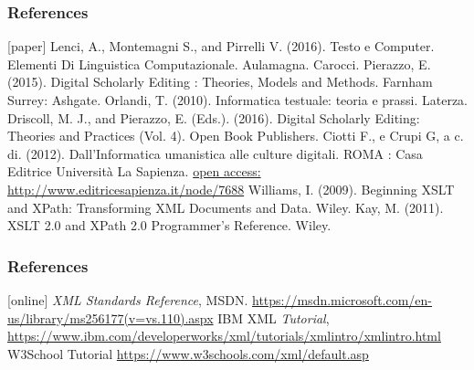 




\begin{frame}
    \frametitle{References}
    \addtocounter{nframe}{1}
    \begin{thebibliography}{10}
        [paper]
        \tiny{} Lenci, A., Montemagni S., and Pirrelli V. (2016). Testo e Computer. Elementi Di Linguistica Computazionale. Aulamagna. Carocci.
        \tiny{} Pierazzo, E. (2015). Digital Scholarly Editing : Theories, Models and Methods. Farnham Surrey: Ashgate.
        \tiny{} Orlandi, T. (2010). Informatica testuale: teoria e prassi. Laterza.
        \tiny{} Driscoll, M. J., and Pierazzo, E. (Eds.). (2016). Digital Scholarly Editing: Theories and Practices (Vol. 4). Open Book Publishers.
        \tiny{} Ciotti F., e Crupi G, a c. di. (2012). Dall’Informatica umanistica alle culture digitali. ROMA : Casa Editrice Università La Sapienza. \href{http://www.editricesapienza.it/node/7688}{open access: http://www.editricesapienza.it/node/7688}
        \tiny{} Williams, I. (2009). Beginning XSLT and XPath: Transforming XML Documents and Data. Wiley.
        \tiny{} Kay, M. (2011). XSLT 2.0 and XPath 2.0 Programmer’s Reference. Wiley.
    \end{thebibliography}

\end{frame}

\begin{frame}
    \frametitle{References}
    \addtocounter{nframe}{1}
    \begin{thebibliography}{10}
        
        [online]
        \tiny{} \textit{XML Standards Reference}, MSDN. \url{https://msdn.microsoft.com/en-us/library/ms256177(v=vs.110).aspx}
        \tiny{} IBM XML \textit{Tutorial}, \url{https://www.ibm.com/developerworks/xml/tutorials/xmlintro/xmlintro.html}
        \tiny{} W3School Tutorial \url{https://www.w3schools.com/xml/default.asp}

    \end{thebibliography}

\end{frame}
